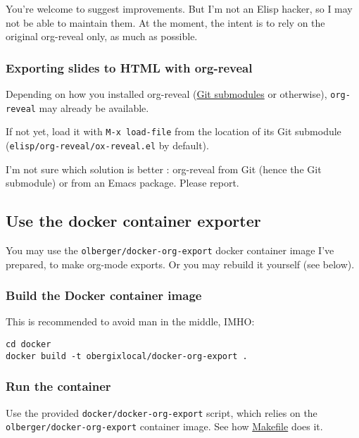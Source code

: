 \documentclass[a4paper]{article}
\newenvironment{NOTES}{\begin{lrbox}{\mybox}\begin{minipage}{0.9\textwidth}\begin{shaded}}{\end{shaded}\end{minipage}\end{lrbox}\fbox{\usebox{\mybox}}}
\begin{document}
\begin{NOTES}
You're welcome to suggest improvements. But I'm not an Elisp hacker,
so I may not be able to maintain them. At the moment, the intent is to
rely on the original org-reveal only, as much as possible.
\end{NOTES}

\subsubsection{Exporting slides to HTML with org-reveal}
\label{sec:org93e20d5}

Depending on how you installed org-reveal (\hyperref[sec:org67a8a81]{Git submodules} or otherwise), \texttt{org-reveal} may already be available.

If not yet, load it with \texttt{M-x load-file} from the location of its Git submodule (\texttt{elisp/org-reveal/ox-reveal.el} by default).

\begin{NOTES}
I'm not sure which solution is better : org-reveal from Git (hence the Git submodule) or from an Emacs package. Please report.
\end{NOTES}

\subsection{Use the docker container exporter}
\label{sec:org366af11}

You may use the \texttt{olberger/docker-org-export} docker container image
I've prepared, to make org-mode exports. Or you may rebuild it
yourself (see below).

\subsubsection{Build the Docker container image}
\label{sec:org6f18e27}

This is recommended to avoid man in the middle, IMHO:

\begin{verbatim}
cd docker
docker build -t obergixlocal/docker-org-export .
\end{verbatim}

\subsubsection{Run the container}
\label{sec:org6c36056}

Use the provided \texttt{docker/docker-org-export} script, which relies on
the \texttt{olberger/docker-org-export} container image. See how \url{Makefile} does it.
\end{document}
